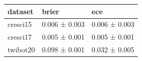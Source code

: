 \begin{tabular}{lll}
\toprule
dataset & brier & ece \\
\midrule
cresci15 & 0.006 ± 0.003 & 0.006 ± 0.003 \\
cresci17 & 0.005 ± 0.001 & 0.005 ± 0.001 \\
twibot20 & 0.098 ± 0.001 & 0.032 ± 0.005 \\
\bottomrule
\end{tabular}
